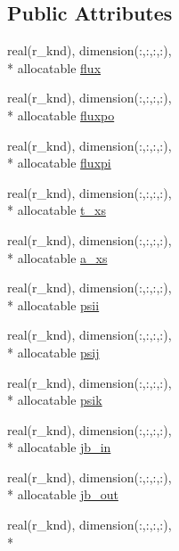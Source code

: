 \subsection*{Public Attributes}
\begin{DoxyCompactItemize}
\item 
real(r\-\_\-knd), dimension(\-:,\-:,\-:,\-:), \\*
allocatable \hyperlink{classsolvar__module_acee52bd8211ef05645267a7f4cc9ec28}{flux}
\item 
real(r\-\_\-knd), dimension(\-:,\-:,\-:,\-:), \\*
allocatable \hyperlink{classsolvar__module_a669bfbe1f13db0527664112817616ca8}{fluxpo}
\item 
real(r\-\_\-knd), dimension(\-:,\-:,\-:,\-:), \\*
allocatable \hyperlink{classsolvar__module_a9d3b4c1745b4b9a6145e2c08530d3daa}{fluxpi}
\item 
real(r\-\_\-knd), dimension(\-:,\-:,\-:,\-:), \\*
allocatable \hyperlink{classsolvar__module_ad35df9ae79e394c41cd47d92a0f26da7}{t\-\_\-xs}
\item 
real(r\-\_\-knd), dimension(\-:,\-:,\-:,\-:), \\*
allocatable \hyperlink{classsolvar__module_a477d603284b13595b11387b21d728dfa}{a\-\_\-xs}
\item 
real(r\-\_\-knd), dimension(\-:,\-:,\-:,\-:), \\*
allocatable \hyperlink{classsolvar__module_a70ce9ad936b5c35e2638616537a783be}{psii}
\item 
real(r\-\_\-knd), dimension(\-:,\-:,\-:,\-:), \\*
allocatable \hyperlink{classsolvar__module_af00b829c43b620a6bde607f930f7b937}{psij}
\item 
real(r\-\_\-knd), dimension(\-:,\-:,\-:,\-:), \\*
allocatable \hyperlink{classsolvar__module_a9d00ffefc30874b3b293efb307b3e551}{psik}
\item 
real(r\-\_\-knd), dimension(\-:,\-:,\-:,\-:), \\*
allocatable \hyperlink{classsolvar__module_a1fdec8e2a20607eda34ee4fd101908b6}{jb\-\_\-in}
\item 
real(r\-\_\-knd), dimension(\-:,\-:,\-:,\-:), \\*
allocatable \hyperlink{classsolvar__module_a29676d4c4d7035869ce09911a15bbd58}{jb\-\_\-out}
\item 
real(r\-\_\-knd), dimension(\-:,\-:,\-:,\-:), \\*

\end{DoxyCompactItemize}
